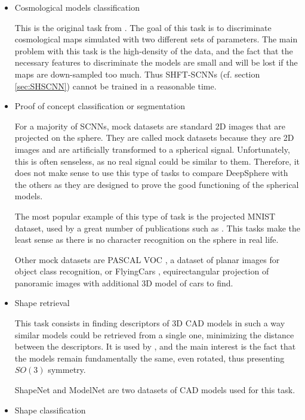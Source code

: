 \documentclass[11pt]{report}
\begin{document}
\begin{itemize}
    \item Cosmological models classification
    
    This is the original task from \cite{perraudin_deepsphere:_2018}.
    The goal of this task is to discriminate cosmological maps simulated with two different sets of parameters.
    The main problem with this task is the high-density of the data, and the fact that the necessary features to discriminate the models are small and will be lost if the maps are down-sampled too much. Thus SHFT-SCNNs (cf. section \ref{sec:SHSCNN}) cannot be trained in a reasonable time.
    \item Proof of concept classification or segmentation
    
    For a majority of SCNNs, mock datasets are standard 2D images that are projected on the sphere. They are called mock datasets because they are 2D images and are artificially transformed to a spherical signal. Unfortunately, this is often senseless, as no real signal could be similar to them. Therefore, it does not make sense to use this type of tasks to compare DeepSphere with the others as they are designed to prove the good functioning of the spherical models.
    
    The most popular example of this type of task is the projected MNIST dataset, used by a great number of publications such as \cite{cohen_spherical_2018, cohen_gauge_2019, khasanova_geometry_nodate, frossard_graph-based_2017, lenssen_group_2018, krachmalnicoff_convolutional_2019, ferrari_spherenet:_2018}. This tasks make the least sense as there is no character recognition on the sphere in real life.
    
    Other mock datasets are PASCAL VOC \cite{su_learning_2017}, a dataset of planar images for object class recognition, or FlyingCars \cite{ferrari_spherenet:_2018}, equirectangular projection of panoramic images with additional 3D model of cars to find. 
    \item Shape retrieval
    
    This task consists in finding descriptors of 3D CAD models in such a way similar models could be retrieved from a single one, minimizing the distance between the descriptors. It is used by \cite{cohen_spherical_2018, esteves_learning_2017, esteves_equivariant_2019}, and the main interest is the fact that the models remain fundamentally the same, even rotated, thus presenting $SO(3)$ symmetry.
    
    ShapeNet and ModelNet are two datasets of CAD models used for this task. 
    \item Shape classification
    

\end{itemize}
\end{document}
